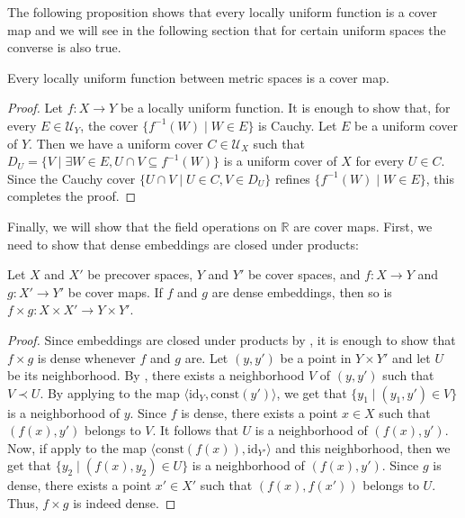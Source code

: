 \documentclass[reqno]{amsart}
\theoremstyle{definition}
\theoremstyle{remark}
\numberwithin{figure}{section}
\newcommand{\rb}{\prec}
\begin{document}
The following proposition shows that every locally uniform function is a cover map and we will see in the following section that for certain uniform spaces the converse is also true.

\begin{prop}
Every locally uniform function between metric spaces is a cover map.
\end{prop}
\begin{proof}
Let $f : X \to Y$ be a locally uniform function.
It is enough to show that, for every $E \in \mathcal{U}_Y$, the cover $\{ f^{-1}(W) \mid W \in E \}$ is Cauchy.
Let $E$ be a uniform cover of $Y$.
Then we have a uniform cover $C \in \mathcal{U}_X$ such that $D_U = \{ V \mid \exists W \in E, U \cap V \subseteq f^{-1}(W) \}$ is a uniform cover of $X$ for every $U \in C$.
Since the Cauchy cover $\{ U \cap V \mid U \in C, V \in D_U \}$ refines $\{ f^{-1}(W) \mid W \in E \}$, this completes the proof.
\end{proof}

Finally, we will show that the field operations on $\mathbb{R}$ are cover maps.
First, we need to show that dense embeddings are closed under products:

\begin{lem}
Let $X$ and $X'$ be precover spaces, $Y$ and $Y'$ be cover spaces, and $f : X \to Y$ and $g : X' \to Y'$ be cover maps.
If $f$ and $g$ are dense embeddings, then so is $f \times g : X \times X' \to Y \times Y'$.
\end{lem}
\begin{proof}
Since embeddings are closed under products by , it is enough to show that $f \times g$ is dense whenever $f$ and $g$ are.
Let $(y,y')$ be a point in $Y \times Y'$ and let $U$ be its neighborhood.
By , there exists a neighborhood $V$ of $(y,y')$ such that $V \rb U$.
By applying  to the map $\langle \mathrm{id}_Y, \mathrm{const}(y') \rangle$, we get that $\{ y_1 \mid (y_1,y') \in V \}$ is a neighborhood of $y$.
Since $f$ is dense, there exists a point $x \in X$ such that $(f(x),y')$ belongs to $V$.
It follows that $U$ is a neighborhood of $(f(x),y')$.
Now, if apply  to the map $\langle \mathrm{const}(f(x)), \mathrm{id}_{Y'} \rangle$ and this neighborhood,
then we get that $\{ y_2 \mid (f(x),y_2) \in U \}$ is a neighborhood of $(f(x),y')$.
Since $g$ is dense, there exists a point $x' \in X'$ such that $(f(x),f(x'))$ belongs to $U$.
Thus, $f \times g$ is indeed dense.
\end{proof}
\end{document}
